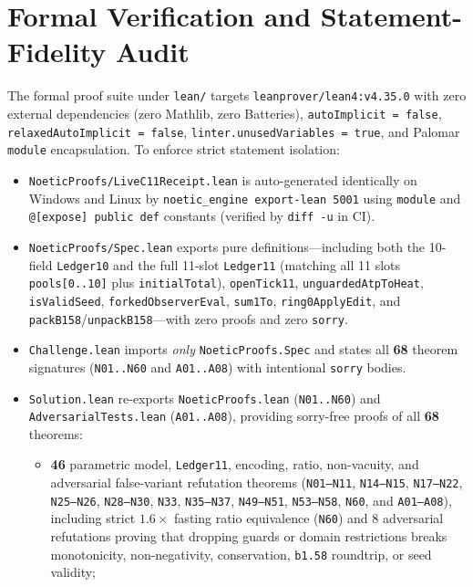 \documentclass[11pt,reqno]{amsart}
\theoremstyle{remark}
\begin{document}
\section{Formal Verification and Statement-Fidelity Audit}
\label{sec:formal}

The formal proof suite under \texttt{lean/} targets \texttt{leanprover/lean4:v4.35.0} with zero external dependencies (zero Mathlib, zero Batteries), \texttt{autoImplicit = false}, \texttt{relaxedAutoImplicit = false}, \texttt{linter.unusedVariables = true}, and Palomar \texttt{module} encapsulation. To enforce strict statement isolation:
\begin{itemize}[leftmargin=1.8em, itemsep=1.5pt]
  \item \texttt{NoeticProofs/LiveC11Receipt.lean} is auto-generated identically on Windows and Linux by \texttt{noetic\_engine export-lean 5001} using \texttt{module} and \texttt{@[expose] public def} constants (verified by \texttt{diff -u} in CI).
  \item \texttt{NoeticProofs/Spec.lean} exports pure definitions—including both the 10-field \texttt{Ledger10} and the full 11-slot \texttt{Ledger11} (matching all 11 slots \texttt{pools[0..10]} plus \texttt{initialTotal}), \texttt{openTick11}, \texttt{unguardedAtpToHeat}, \texttt{isValidSeed}, \texttt{forkedObserverEval}, \texttt{sum1To}, \texttt{ring0ApplyEdit}, and \texttt{packB158}/\texttt{unpackB158}—with zero proofs and zero \texttt{sorry}.
  \item \texttt{Challenge.lean} imports \emph{only} \texttt{NoeticProofs.Spec} and states all \textbf{68} theorem signatures (\texttt{N01..N60} and \texttt{A01..A08}) with intentional \texttt{sorry} bodies.
  \item \texttt{Solution.lean} re-exports \texttt{NoeticProofs.lean} (\texttt{N01..N60}) and \texttt{AdversarialTests.lean} (\texttt{A01..A08}), providing sorry-free proofs of all \textbf{68} theorems:
  \begin{itemize}[leftmargin=1.4em, itemsep=1pt]
    \item \textbf{46} parametric model, \texttt{Ledger11}, encoding, ratio, non-vacuity, and adversarial false-variant refutation theorems (\texttt{N01--N11}, \texttt{N14--N15}, \texttt{N17--N22}, \texttt{N25--N26}, \texttt{N28--N30}, \texttt{N33}, \texttt{N35--N37}, \texttt{N49--N51}, \texttt{N53--N58}, \texttt{N60}, and \texttt{A01--A08}), including strict $1.6\times$ fasting ratio equivalence (\texttt{N60}) and 8 adversarial refutations proving that dropping guards or domain restrictions breaks monotonicity, non-negativity, conservation, \texttt{b1.58} roundtrip, or seed validity;

\end{itemize}
\end{itemize}
\end{document}
